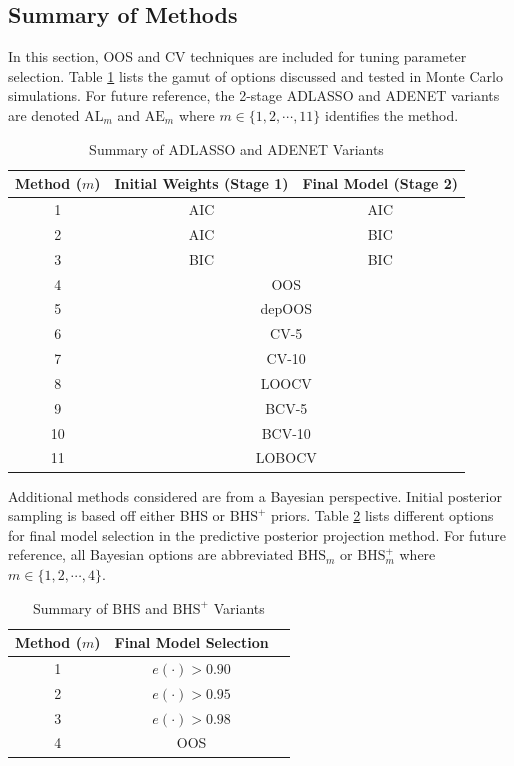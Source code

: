 \subsection{Summary of Methods}

In this section, OOS and CV techniques are included for tuning parameter selection. Table \ref{tab:aicbic} lists the gamut of options discussed and tested in Monte Carlo simulations. For future reference, the 2-stage ADLASSO and ADENET variants are denoted $\textrm{AL}_m$ and $\textrm{AE}_m$ where $m \in \{1,2,\cdots,11\}$ identifies the method. 

\begin{table}[!h]
  \footnotesize
  \centering
  \caption{Summary of ADLASSO and ADENET Variants}
    \begin{tabular}{c|cc}
    \toprule
    Method ($m$) & Initial Weights (Stage 1) & Final Model (Stage 2)  \\
    \midrule
    1 & AIC & AIC\\
    2 & AIC & BIC \\
    3 & BIC & BIC \\
    \midrule
    4 & \multicolumn{2}{c}{OOS} \\
    5 & \multicolumn{2}{c}{depOOS} \\
    \midrule
    6 & \multicolumn{2}{c}{CV-5} \\
    7 & \multicolumn{2}{c}{CV-10} \\
    8 & \multicolumn{2}{c}{LOOCV} \\
    \midrule
    9 & \multicolumn{2}{c}{BCV-5} \\
    10 & \multicolumn{2}{c}{BCV-10} \\
    11 & \multicolumn{2}{c}{LOBOCV} \\
    \bottomrule
    \end{tabular}%
  \label{tab:aicbic}%
\end{table}%

Additional methods considered are from a Bayesian perspective. Initial posterior sampling is based off either BHS or $\textrm{BHS}^+$ priors. Table \ref{tab:bhstypes} lists different options for final model selection in the predictive posterior projection method. For future reference, all Bayesian options are abbreviated $\textrm{BHS}_m$ or $\textrm{BHS}^+_m$ where $m \in \{1,2,\cdots,4\}$. 

\begin{table}[!h]
  \footnotesize
  \centering
  \caption{Summary of BHS and $\textrm{BHS}^+$ Variants }
    \begin{tabular}{c|cc}
    \toprule
    Method ($m$) & Final Model Selection  \\
    \midrule
    1 & $e(\cdot)>0.90$ \\
    2 & $e(\cdot)>0.95$ \\
    3 & $e(\cdot)>0.98$\\
    \midrule
    4 & OOS\\
    \bottomrule
    \end{tabular}%
  \label{tab:bhstypes}%
\end{table}%







